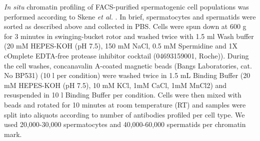 \emph{In situ} chromatin profiling of FACS-purified spermatogenic cell populations was performed according to Skene \emph{et al.} \citep{Skene2018}. In brief, spermatocytes and spermatids were sorted as described above and collected in PBS. Cells were spun down at 600 g for 3 minutes in swinging-bucket rotor and washed twice with 1.5 ml Wash buffer (20 mM HEPES-KOH (pH 7.5), 150 mM NaCl, 0.5 mM Spermidine and 1X cOmplete\texttrademark{} EDTA-free protease inhibitor cocktail (04693159001, Roche)). During the cell washes, concanavalin A-coated magnetic beads (Bangs Laboratories, cat. No BP531) (10 \textmu{}l per condition) were washed twice in 1.5 mL Binding Buffer (20 mM HEPES-KOH (pH 7.5), 10 mM KCl, 1mM CaCl, 1mM MnCl2) and resuspended in 10 \textmu{}l Binding Buffer per condition. Cells were then mixed with beads and rotated for 10 minutes at room temperature (RT) and samples were split into aliquots according to number of antibodies profiled per cell type. We used 20,000-30,000 spermatocytes and 40,000-60,000 spermatids per chromatin mark.\\ 


